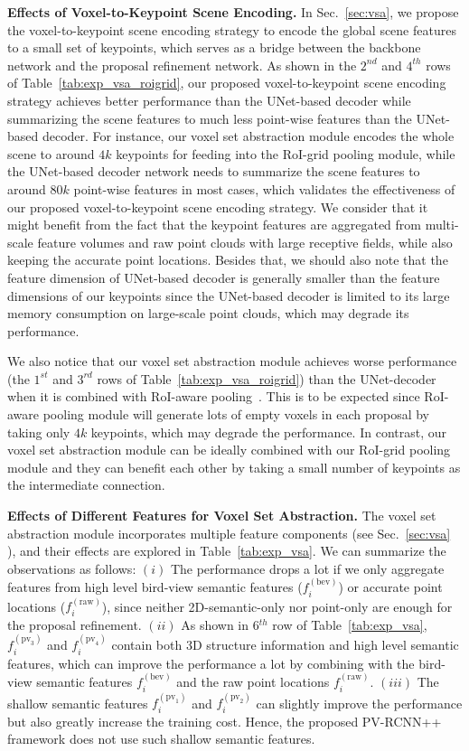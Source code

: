 \documentclass[natbib,twocolumn]{svjour3}          \smartqed  \usepackage{graphicx}
\begin{document}
\noindent
\textbf{Effects of Voxel-to-Keypoint Scene Encoding.}
In Sec.~\ref{sec:vsa}, we propose the voxel-to-keypoint scene encoding strategy to encode the global scene features to a small set of keypoints, which serves as a bridge between the backbone network and the proposal refinement network.
As shown in the $2^{nd}$ and $4^{th}$ rows of Table~\ref{tab:exp_vsa_roigrid}, 
our proposed voxel-to-keypoint scene encoding strategy achieves 
better performance than the UNet-based decoder while summarizing the scene features to much less point-wise features than the UNet-based decoder.
For instance, our voxel set abstraction module encodes the whole scene to around $4k$ keypoints for feeding into the RoI-grid pooling module, while the UNet-based decoder network needs to summarize the scene features to around $80k$ point-wise features in most cases, which validates the effectiveness of our proposed voxel-to-keypoint scene encoding strategy. 
We consider that it might benefit from the fact that the keypoint features are aggregated from multi-scale feature volumes and raw point clouds with large receptive fields,  
while also keeping the accurate point locations. 
Besides that, we should also note that the feature dimension of UNet-based decoder is generally smaller than the feature dimensions of our keypoints since the UNet-based decoder is limited to its large memory consumption on large-scale point clouds, which may degrade its performance.

We also notice that our voxel set abstraction module achieves worse performance (the $1^{st}$ and $3^{rd}$ rows of Table~\ref{tab:exp_vsa_roigrid}) than the UNet-decoder when it is combined with RoI-aware pooling~\citep{shi2020part}. This is to be expected since RoI-aware pooling module will generate lots of empty voxels in each proposal by taking only $4k$ keypoints, which may degrade the performance. 
In contrast, our voxel set abstraction module can be ideally combined with our RoI-grid pooling module and they can benefit each other by taking a small number of keypoints as the intermediate connection. 




\noindent
\textbf{Effects of Different Features for Voxel Set Abstraction.}
The voxel set abstraction module incorporates multiple feature components (see Sec.~\ref{sec:vsa} ), and their effects are explored in Table~\ref{tab:exp_vsa}. We can summarize the observations as follows: 
$(i)$ The performance drops a lot if we only aggregate features from high level bird-view semantic features ($f_i^{(\text{bev})}$) or accurate point locations ($f_i^{(\text{raw})}$), since neither 2D-semantic-only nor point-only are enough for the proposal refinement. 
$(ii)$ As shown in 6$^{th}$ row of Table~\ref{tab:exp_vsa}, $f_i^{(\text{pv}_3)}$ and $f_i^{(\text{pv}_4)}$ contain both 3D structure information and high level semantic features, which can improve the performance a lot by combining with the bird-view semantic features $f_i^{(\text{bev})}$ and the raw point locations $f_i^{(\text{raw})}$. 
$(iii)$ The shallow semantic features $f_i^{(\text{pv}_1)}$ and $f_i^{(\text{pv}_2)}$ can slightly improve the performance but also greatly increase the training cost. Hence, the proposed PV-RCNN++ framework does not use such shallow semantic features.
\end{document}
